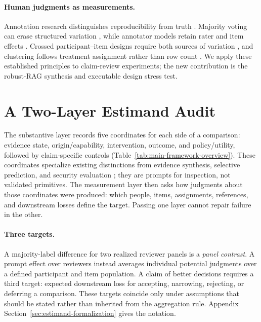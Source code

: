\documentclass[11pt]{article}
\begin{document}
\paragraph{Human judgments as measurements.}
Annotation research distinguishes reproducibility from truth
\citep{artstein2008intercoder}. Majority voting can erase structured variation
\citep{plank2022labelvariation,davani2022disagreements}, while annotator models
retain rater and item effects \citep{passonneau2014annotation,
paun2018bayesian}. Crossed participant--item designs require both sources of
variation \citep{baayen2008crossed}, and clustering follows treatment
assignment rather than row count \citep{abadie2023clustering}. We apply these
established principles to claim-review experiments; the new contribution is
the robust-RAG synthesis and executable design stress test.



\section{A Two-Layer Estimand Audit}
\label{sec:estimands}

The substantive layer records five coordinates for each side of a comparison:
evidence state, origin/capability, intervention, outcome, and policy/utility,
followed by claim-specific controls
(Table~\ref{tab:main-framework-overview}). These coordinates specialize
existing distinctions from evidence synthesis, selective prediction, and
security evaluation \citep{richardson1995pico,chow1970reject,
papernot2018sok}; they are prompts for inspection, not validated primitives.
The measurement layer then asks how judgments about those coordinates were
produced: which people, items, assignments, references, and downstream losses
define the target. Passing one layer cannot repair failure in the other.



\paragraph{Three targets.}
A majority-label difference for two realized reviewer panels is a
\emph{panel contrast}. A prompt effect over reviewers instead averages
individual potential judgments over a defined participant and item
population. A claim of better decisions requires a third target: expected
downstream loss for accepting, narrowing, rejecting, or deferring a
comparison. These targets coincide only under assumptions that should be
stated rather than inherited from the aggregation rule. Appendix
Section~\ref{sec:estimand-formalization} gives the notation.
\end{document}
